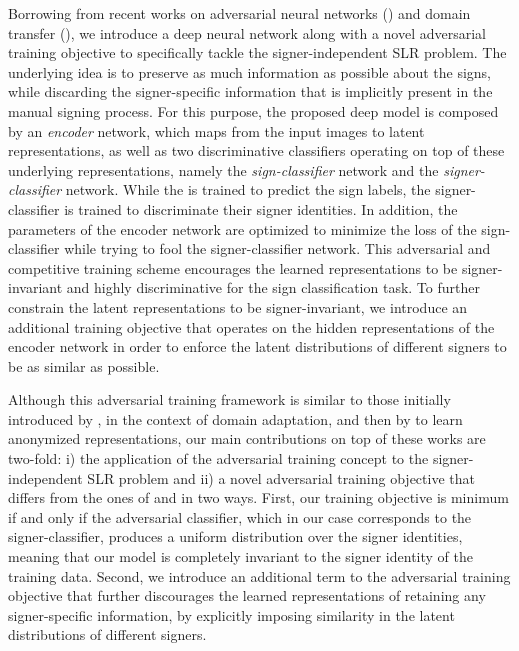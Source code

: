 Borrowing from recent works on adversarial neural networks (\citet{Goodfellow2014, Feutry2018}) and domain transfer (\citet{Ganin2015}), we introduce a deep neural network along with a novel adversarial training objective to specifically tackle the signer-independent SLR problem. The underlying idea is to preserve as much information as possible about the signs, while discarding the signer-specific information that is implicitly present in the manual signing process. For this purpose, the proposed deep model is composed by an \emph{encoder} network, which maps from the input images to latent representations, as well as two discriminative classifiers operating on top of these underlying representations, namely the \emph{sign-classifier} network and the \emph{signer-classifier} network. While the is trained to predict the sign labels, the signer-classifier is trained to discriminate their signer identities. In addition, the parameters of the encoder network are optimized to minimize the loss of the sign-classifier while trying to fool the signer-classifier network. This adversarial and competitive training scheme encourages the learned representations to be signer-invariant and highly discriminative for the sign classification task. To further constrain the latent representations to be signer-invariant, we introduce an additional training objective that operates on the hidden representations of the encoder network in order to enforce the latent distributions of different signers to be as similar as possible.

Although this adversarial training framework is similar to those initially introduced by \citet{Ganin2015}, in the context of domain adaptation, and then by \citet{Feutry2018} to learn anonymized representations, our main contributions on top of these works are two-fold: i) the application of the adversarial training concept to the signer-independent SLR problem and ii) a novel adversarial training objective that differs from the ones of \citet{Ganin2015} and \citet{Feutry2018} in two ways. First, our training objective is minimum if and only if the adversarial classifier, which in our case corresponds to the signer-classifier, produces a uniform distribution over the signer identities, meaning that our model is completely invariant to the signer identity of the training data. Second, we introduce an additional term to the adversarial training objective that further discourages the learned representations of retaining any signer-specific information, by explicitly imposing similarity in the latent distributions of different signers.

